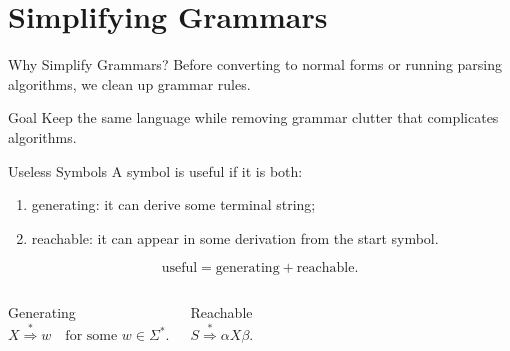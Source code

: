 \documentclass[aspectratio=169,10pt]{beamer}
\newcommand{\eps}{\varepsilon}
\newcommand{\ders}{\overset{*}{\Rightarrow}}
\begin{document}
\section{Simplifying Grammars}

\begin{frame}{Why Simplify Grammars?}
\small
Before converting to normal forms or running parsing algorithms, we clean up grammar rules.

\begin{center}
\end{center}

\begin{alertblock}{Goal}
Keep the same language while removing grammar clutter that complicates algorithms.
\end{alertblock}
\end{frame}

\begin{frame}{Useless Symbols}
\small
A symbol is \alert{useful} if it is both:

\begin{enumerate}
    \item \alert{generating}: it can derive some terminal string;
    \item \alert{reachable}: it can appear in some derivation from the start symbol.
\end{enumerate}

\[
\text{useful}=\text{generating}+\text{reachable}.
\]

\begin{columns}[T,onlytextwidth]
\begin{block}{Generating}
\[
X\ders w\quad\text{for some }w\in\Sigma^*.
\]
\end{block}

\begin{exampleblock}{Reachable}
\[
S\ders \alpha X\beta.
\]
\end{exampleblock}
\end{columns}
\end{frame}
\end{document}
